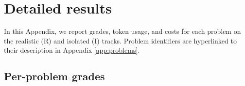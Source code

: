 \section{Detailed results}
\label{appdetailedresults}
In this Appendix, we report grades, token usage, and costs for each problem on the realistic (R) and isolated (I) tracks. Problem identifiers are hyperlinked to their description in Appendix \ref{app:problems}.

\subsection{Per-problem grades}



